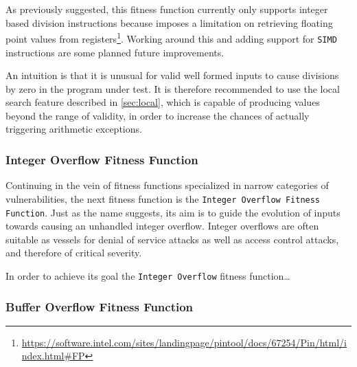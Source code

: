 As previously suggested, this fitness function currently only supports integer based division instructions
because \pin imposes a limitation on retrieving floating point values from
registers\footnote{\url{https://software.intel.com/sites/landingpage/pintool/docs/67254/Pin/html/index.html\#FP}}.
Working around this and adding support for \texttt{SIMD} instructions are some planned future improvements.

An intuition is that it is unusual for valid well formed inputs to cause divisions by zero in the program under
test. It is therefore recommended to use the local search feature described in \cref{sec:local}, which is
capable of producing values beyond the range of validity, in order to increase the chances of actually
triggering arithmetic exceptions.

 
\subsubsection{Integer Overflow Fitness Function}
Continuing in the vein of fitness functions specialized in narrow categories of vulnerabilities, the next
fitness function is the \texttt{Integer Overflow Fitness Function}. Just as the name suggests, its aim is to
guide the evolution of inputs towards causing an unhandled integer overflow. Integer overflows are often
suitable as vessels for denial of service attacks as well as access control attacks, and therefore of
critical severity. 

In order to achieve its goal the \texttt{Integer Overflow} fitness function\ldots
{}

\subsubsection{Buffer Overflow Fitness Function}
